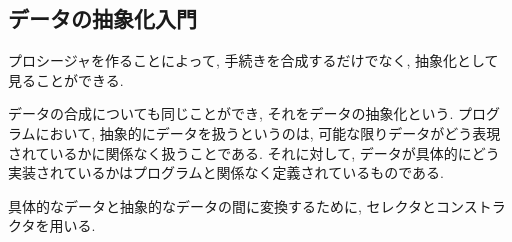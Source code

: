 \subsection{データの抽象化入門}
プロシージャを作ることによって, 手続きを合成するだけでなく,
抽象化として見ることができる.

データの合成についても同じことができ, それをデータの抽象化という.
プログラムにおいて, 抽象的にデータを扱うというのは,
可能な限りデータがどう表現されているかに関係なく扱うことである.
それに対して, データが具体的にどう実装されているかはプログラムと関係なく定義されているものである.

具体的なデータと抽象的なデータの間に変換するために, セレクタとコンストラクタを用いる.
%

%

%

